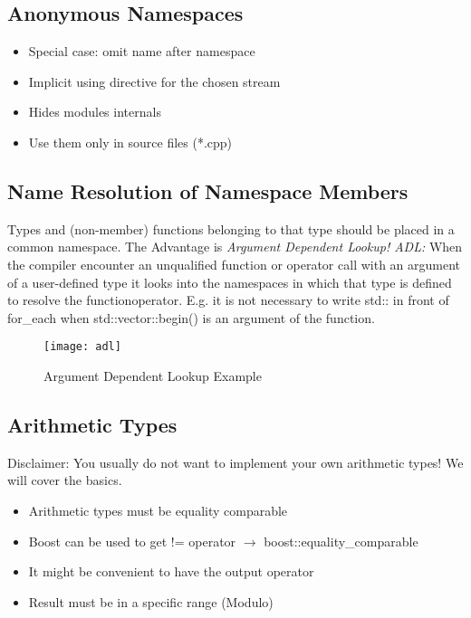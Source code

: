 \subsection{Anonymous Namespaces}
\begin{itemize}
  \itemsep -0.5em 
  \item Special case: omit name after namespace
  \item Implicit using directive for the chosen stream
  \item Hides modules internals
  \item Use them only in source files (*.cpp)
\end{itemize}


\subsection{Name Resolution of Namespace Members}
Types and (non-member) functions belonging to that type should be placed in a common namespace. The Advantage is \textit{Argument Dependent Lookup! ADL:} When the compiler encounter an unqualified function or operator call with an argument of a user-defined type it looks into the namespaces in which that type is defined to resolve the function\/operator. E.g. it is not necessary to write std:: in front of for\_each when std::vector::begin() is an argument of the function.


\begin{figure}[h!]
  \center
  \texttt{[image: adl]}
  \caption{Argument Dependent Lookup Example}
\end{figure}



\subsection{Arithmetic Types}
Disclaimer: You usually do not want to implement your own arithmetic types! We will cover the basics.

\begin{itemize}
	\itemsep -0.5em
    \item Arithmetic types must be equality comparable
    \item Boost can be used to get != operator $\rightarrow$ boost::equality\_comparable
    \item It might be convenient to have the output operator
    \item Result must be in a specific range (Modulo)
\end{itemize}